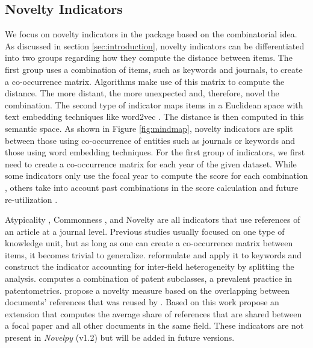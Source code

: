 \subsection{Novelty Indicators}

We focus on novelty indicators in the package based on the combinatorial idea. As discussed in section \ref{sec:introduction}, novelty indicators can be differentiated into two groups regarding how they compute the distance between items.
The first group uses a combination of items, such as keywords and journals, to create a co-occurrence matrix. Algorithms make use of this matrix to compute the distance. The more distant, the more unexpected and, therefore, novel the combination. The second type of indicator maps items in a Euclidean space with text embedding techniques like word2vec \citep{mikolov2013distributed}. The distance is then computed in this semantic space.
As shown in Figure \ref{fig:mindmap}, novelty indicators are split between those using co-occurrence of entities such as journals or keywords and those using word embedding techniques. For the first group of indicators, we first need to create a co-occurrence matrix for each year of the given dataset. While some indicators only use the focal year to compute the score for each combination \citep{uzzi2013atypical, lee2015creativity, carayol2019}, others take into account past combinations in the score calculation \citep{foster2015tradition} and future re-utilization \citep{wang2017bias}.


Atypicality \citep{uzzi2013atypical}, Commonness \citep{lee2015creativity}, and Novelty \citep{wang2017bias} are all indicators that use references of an article at a journal level. Previous studies usually focused on one type of knowledge unit, but as long as one can create a co-occurrence matrix between items, it becomes trivial to generalize. \cite{carayol2019} reformulate \cite{lee2015creativity} and apply it to keywords and construct the indicator accounting for inter-field heterogeneity by splitting the analysis. \cite{fleming2001recombinant} computes a combination of patent subclasses, a prevalent practice in patentometrics. \cite{dahlin2005invention} propose a novelty measure based on the overlapping between documents' references that was reused by \cite{trapido2015novelty}. Based on this work \cite{matsumoto2021introducing} propose an extension that computes the average share of references that are shared between a focal paper and all other documents in the same field. These indicators are not present in \textit{Novelpy} (v1.2) but will be added in future versions.

